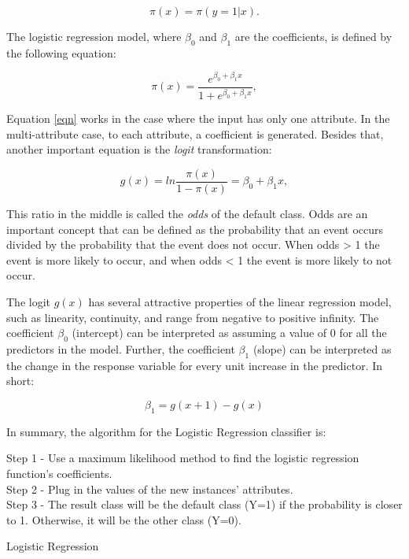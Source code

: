 \begin{equation} \pi(x) =\pi(y=1|x). \end{equation}

The logistic regression model, where $\beta_0$ and $\beta_1$ are the coefficients, is defined by the following equation:

\begin{equation} \label{eqn} \pi(x) = \frac{e^{\beta_0+\beta_1x}}{1+e^{\beta_0+\beta_1x}}, \end{equation}

Equation \eqref{eqn} works in the case where the input has only one attribute. In the multi-attribute case, to each attribute, a coefficient is generated. Besides that, another important equation is the \emph{logit} transformation:

\begin{equation} g(x) = ln\frac{\pi(x)}{1-\pi(x)} = \beta_0+\beta_1x, \end{equation}

This ratio in the middle is called the \emph{odds} of the default class. Odds are an important concept that can be defined as the probability that an event occurs divided by the probability that the event does not occur. When odds > 1 the event is more likely to occur, and when odds < 1 the event is more likely to not occur.

The logit $g(x)$ has several attractive properties of the linear regression model, such as linearity, continuity, and range from negative to positive infinity. The coefficient $\beta_0$ (intercept) can be interpreted as assuming a value of 0 for all the predictors in the model. Further, the coefficient $\beta_1$ (slope) can be interpreted as the change in the response variable for every unit increase in the predictor. In short:

\begin{equation} \beta_1 = g(x+1) - g(x) \end{equation}

In summary, the algorithm for the Logistic Regression classifier is:

\begin{algorithm}[H]
Step 1 - Use a maximum likelihood method to find the logistic regression function's coefficients. \\
Step 2 - Plug in the values of the new instances' attributes. \\
Step 3 - The result class will be the default class (Y=1) if the probability is closer to 1. Otherwise, it will be the other class (Y=0). 
\caption{Logistic Regression}
\end{algorithm}


